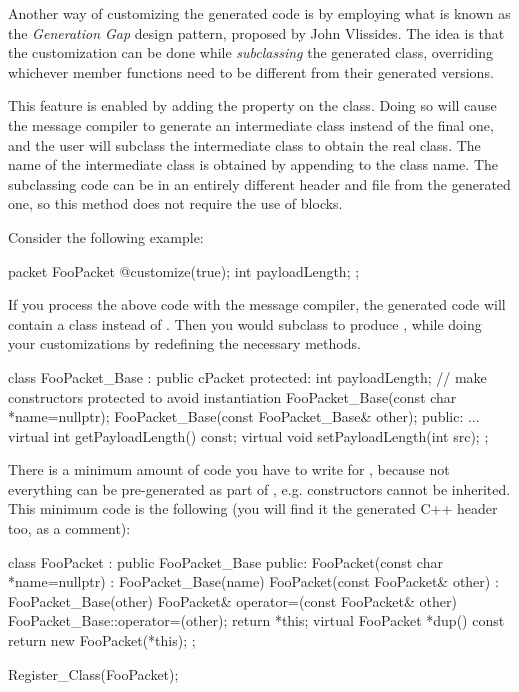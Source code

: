 Another way of customizing the generated code is by employing what is known as
the \textit{Generation Gap} design pattern, proposed by John Vlissides. The idea
is that the customization can be done while \textit{subclassing} the generated
class, overriding whichever member functions need to be different from their
generated versions.

This feature is enabled by adding the  property on the class.
Doing so will cause the message compiler to generate an intermediate class
instead of the final one, and the user will subclass the intermediate class to
obtain the real class. The name of the intermediate class is obtained by
appending  to the class name. The subclassing code can be in an
entirely different header and  file from the generated one, so this
method does not require the use of  blocks.

Consider the following example:

\begin{msg}
packet FooPacket
{
   @customize(true);
   int payloadLength;
};
\end{msg}

If you process the above code with the message compiler, the generated code will
contain a  class instead of . Then you would
subclass  to produce , while doing your
customizations by redefining the necessary methods.

\begin{cpp}
class FooPacket_Base : public cPacket
{
  protected:
    int payloadLength;
    // make constructors protected to avoid instantiation
    FooPacket_Base(const char *name=nullptr);
    FooPacket_Base(const FooPacket_Base& other);
  public:
    ...
    virtual int getPayloadLength() const;
    virtual void setPayloadLength(int src);
};
\end{cpp}

There is a minimum amount of code you have to write for , because
not everything can be pre-generated as part of , e.g.
constructors cannot be inherited. This minimum code is the following (you will
find it the generated C++ header too, as a comment):

\begin{cpp}
class FooPacket : public FooPacket_Base
{
  public:
    FooPacket(const char *name=nullptr) : FooPacket_Base(name) {}
    FooPacket(const FooPacket& other) : FooPacket_Base(other) {}
    FooPacket& operator=(const FooPacket& other)
        {FooPacket_Base::operator=(other); return *this;}
    virtual FooPacket *dup() const {return new FooPacket(*this);}
};

Register_Class(FooPacket);
\end{cpp}

